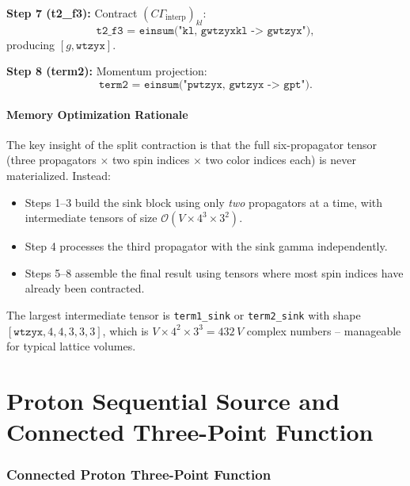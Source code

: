 \documentclass[11pt,a4paper]{article}
\newcommand{\Gint}{\Gamma_{\text{interp}}}
\newcommand{\Cmat}{C}
\begin{document}
\medskip\noindent
\textbf{Step 7 (t2\_f3):} Contract $(\Cmat\Gint)_{kl}$:
\begin{equation}
  \texttt{t2\_f3 = einsum("kl, gwtzyxkl -> gwtzyx")},
\end{equation}
producing $[g,\texttt{wtzyx}]$.

\medskip\noindent
\textbf{Step 8 (term2):} Momentum projection:
\begin{equation}
  \texttt{term2 = einsum("pwtzyx, gwtzyx -> gpt")}.
\end{equation}

\subsection{Memory Optimization Rationale}

The key insight of the split contraction is that the full six-propagator tensor
(three propagators $\times$ two spin indices $\times$ two color indices each) is
never materialized.  Instead:
\begin{itemize}
  \item Steps 1--3 build the sink block using only \emph{two} propagators at a time,
        with intermediate tensors of size $\mathcal{O}(V \times 4^{3} \times 3^{2})$.
  \item Step 4 processes the third propagator with the sink gamma independently.
  \item Steps 5--8 assemble the final result using tensors where most spin indices
        have already been contracted.
\end{itemize}
The largest intermediate tensor is \texttt{term1\_sink} or \texttt{term2\_sink}
with shape $[\texttt{wtzyx}, 4, 4, 3, 3, 3]$, which is
$V \times 4^{2} \times 3^{3} = 432\,V$ complex numbers -- manageable for typical
lattice volumes.

\part{Proton Sequential Source and Connected Three-Point Function}

\section{Connected Proton Three-Point Function}
\end{document}
